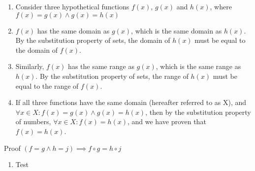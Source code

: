 \documentclass{article}
\begin{document}
\begin{enumerate}
\begin{enumerate}
                \item Consider three hypothetical functions $f(x)$, $g(x)$ and $h(x)$, where $f(x)=g(x) \land g(x)=h(x)$
                \item $f(x)$ has the same domain as $g(x)$, which is the same domain as $h(x)$. By the substitution property of sets,
                    the domain of $h(x)$ must be equal to the domain of $f(x)$.
                \item Similarly, $f(x)$ has the same range as $g(x)$, which is the same range as $h(x)$. By the substitution property of sets,
                    the range of $h(x)$ must be equal to the range of $f(x)$.
                \item If all three functions have the same domain (hereafter referred to as X), and $\forall x \in X: f(x) = g(x) \land g(x) = h(x)$,
                    then by the substitution property of numbers, $\forall x \in X: f(x) = h(x)$, and we have proven that $f(x) = h(x)$.
            \end{enumerate}
            Proof $(f = g \land h = j) \implies f \circ g = h \circ j$
            \begin{enumerate}
                \item Test
            \end{enumerate}
    \end{enumerate}
\end{document}

